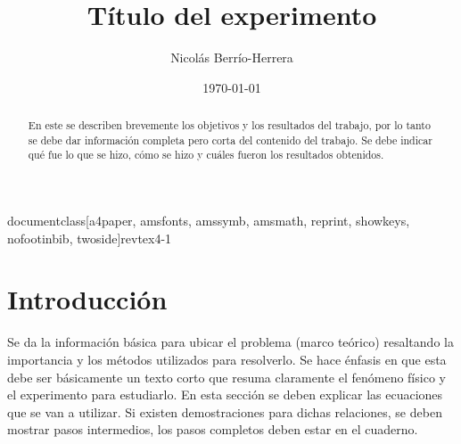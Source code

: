 documentclass[a4paper, amsfonts, amssymb, amsmath, reprint, showkeys, nofootinbib, twoside]{revtex4-1}
\usepackage[spanish]{babel}
\usepackage[utf8]{inputenc}
\usepackage{float}
\usepackage[colorinlistoftodos, color=green!40, prependcaption]{todonotes}
\usepackage{amsthm}
\usepackage{mathtools}
\usepackage{physics}
\usepackage{xcolor}
\usepackage{graphicx}
\usepackage[left=23mm,right=13mm,top=35mm,columnsep=15pt]{geometry} 
\usepackage{adjustbox}
\usepackage{placeins}
\usepackage[T1]{fontenc}
\usepackage{lipsum}
\usepackage{csquotes}
\usepackage[normalem]{ulem}
\useunder{\uline}{\ul}{}
\usepackage[pdftex, pdftitle={Article}, pdfauthor={Author}]{hyperref} %




\title{Título del experimento}


\author{Nicolás Berrío-Herrera}

  


\date{\today} %

\begin{abstract}

En este se describen brevemente los objetivos y los resultados del trabajo, por lo tanto se debe dar información completa pero corta del contenido del trabajo. Se debe indicar qué fue lo que se hizo, cómo se hizo y cuáles fueron los resultados obtenidos.

\end{abstract}

\maketitle

\section{Introducción}

Se da la información básica para ubicar el problema (marco teórico) resaltando la importancia y los métodos utilizados para resolverlo. Se hace énfasis en que esta debe ser básicamente un texto corto que resuma claramente el fenómeno físico y el experimento para estudiarlo. En esta  sección se deben explicar las ecuaciones que se van a utilizar. Si existen demostraciones para dichas relaciones, se deben mostrar pasos intermedios, los pasos completos deben estar en el cuaderno.

